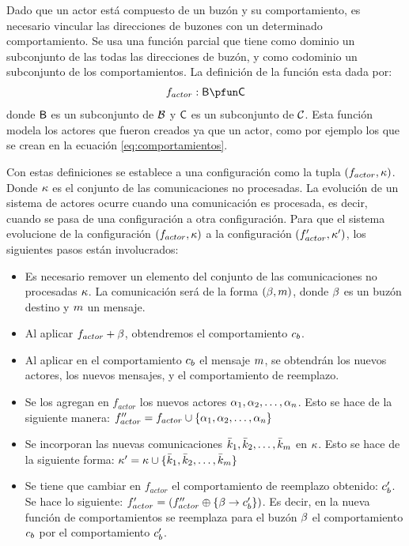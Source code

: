 Dado que un actor está compuesto de un buzón y su comportamiento, es necesario vincular las direcciones de buzones con un determinado comportamiento. Se usa una función parcial que tiene como dominio un subconjunto de las todas las direcciones de buzón, y como codominio un subconjunto de los comportamientos. La definición de la función esta dada por:
\begin{align}\label{eq:actores}
f_{actor} : \BUZONESSUB \pfun \COMPORTAMIENTOSSUB
\end{align}
donde $\mathsf{B}$ es un subconjunto de $\mathcal{B}$ y $\mathsf{C}$ es un subconjunto de $\mathcal{C}$. Esta función modela los actores que fueron creados ya que un actor, como por ejemplo los que se crean en la ecuación \ref{eq:comportamientos}. 

Con estas definiciones se establece a una configuración como la tupla $(f_{actor}, \kappa)$. Donde $\kappa$ es el conjunto de las comunicaciones no procesadas. La evolución de un sistema de actores ocurre cuando una comunicación es procesada, es decir, cuando se pasa de una configuración a otra configuración. Para que el sistema evolucione de la configuración $(f_{actor}, \kappa)$ a la configuración $(f'_{actor}, \kappa')$, los siguientes pasos están involucrados:
\begin{itemize}
 \item Es necesario remover un elemento del conjunto de las comunicaciones no procesadas $\kappa$. La comunicación será de la forma $(\beta, m)$, donde $\beta$ es un buzón destino y $m$ un mensaje. 
 \item Al aplicar $f_{actor} + \beta$, obtendremos el comportamiento $c_b$. 
 \item Al aplicar en el comportamiento $c_b$ el mensaje $m$, se obtendrán los nuevos actores, los nuevos mensajes, y el comportamiento de reemplazo.
 \item Se los agregan en $f_{actor}$ los nuevos actores $\alpha_1, \alpha_2, \ldots, \alpha_n$. Esto se hace de la siguiente manera: $f''_{actor} = f_{actor} \cup \{ \alpha_1, \alpha_2, \ldots, \alpha_n \}$
 \item Se incorporan las nuevas comunicaciones $\bar{k}_1, \bar{k}_2, \ldots, \bar{k}_m$ en $\kappa$. Esto se hace de la siguiente forma: $\kappa' = \kappa \cup \{ \bar{k}_1, \bar{k}_2, \ldots, \bar{k}_m \}$
 \item Se tiene que cambiar en $f_{actor}$ el comportamiento de reemplazo obtenido: $c_b'$. Se hace lo siguiente:  $f'_{actor} = ( f''_{actor} \oplus \{ \beta \rightarrow c'_b \})$. Es decir, en la nueva función de comportamientos se reemplaza para el buzón $\beta$ el comportamiento $c_b$ por el comportamiento $c'_b$.
\end{itemize} 

